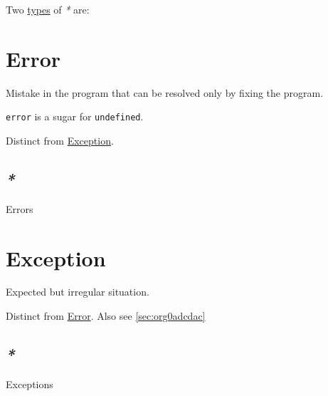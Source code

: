 \documentclass[a4paper,14pt,oneside]{book}
\begin{document}
Two \hyperref[org8e179ef]{types} of \emph{*} are:

\chapter{\label{org23c7a06}Error}
\label{sec:org0efd1f3}
Mistake in the program that can be resolved only by fixing the program.

\texttt{error} is a sugar for \texttt{undefined}.

Distinct from \hyperref[org7dff0cd]{Exception}.

\section{\emph{*}}
\label{sec:org029146f}

\label{org15949df}Errors

\chapter{\label{org7dff0cd}Exception}
\label{sec:org92e1434}
Expected but irregular situation.

Distinct from \hyperref[org23c7a06]{Error}. Also see \ref{sec:org0adcdac}

\section{\emph{*}}
\label{sec:orgf50bf44}

\label{orgb96d5c8}Exceptions
\end{document}
